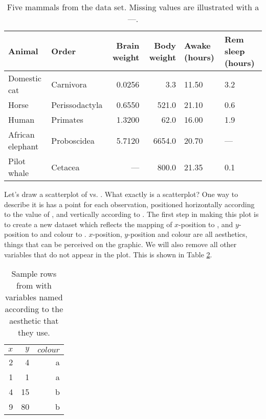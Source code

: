 


\begin{table}
  \begin{center}
  \begin{tabular}{llrrp{2cm}p{2cm}}
    \toprule
    Animal & Order & Brain weight & Body weight & Awake (hours) & Rem sleep (hours) \\
    \midrule
    Domestic cat     & Carnivora      & 0.0256 &    3.3 & 11.50 & 3.2\\
    Horse            & Perissodactyla & 0.6550 &  521.0 & 21.10 & 0.6\\
    Human            & Primates       & 1.3200 &   62.0 & 16.00 & 1.9\\
    African elephant & Proboscidea    & 5.7120 & 6654.0 & 20.70 & ---\\
    Pilot whale      & Cetacea        &    --- &  800.0 & 21.35 & 0.1\\
    \bottomrule
  \end{tabular}
  \end{center}
  \caption{Five mammals from the  data set.  Missing values are illustrated with a ---.  }
  \label{label}
\end{table}


Let's draw a scatterplot of  vs. .  What exactly is a scatterplot?  One way to describe it is has a point for each observation, positioned horizontally according to the value of , and vertically according to .  The first step in making this plot is to create a new dataset which reflects the mapping of $x$-position to , and $y$-position to  and colour to .  $x$-position, $y$-position and colour are all aesthetics, things that can be perceived on the graphic. We will also remove all other variables that do not appear in the plot.  This is shown in Table \ref{tbl:mapping}.

\begin{table}[ht]
	\begin{center}
	\begin{tabular}{r|r|r}
		$x$ & $y$ & $colour$\\
		\hline
		2 & 4 & a\\
		1 & 1 & a\\
		4 & 15 & b\\
		9 & 80 & b
	\end{tabular}
	\end{center}
	\caption{Sample rows from  with variables named according to the aesthetic that they use.}
	\label{tbl:mapping}
\end{table}

